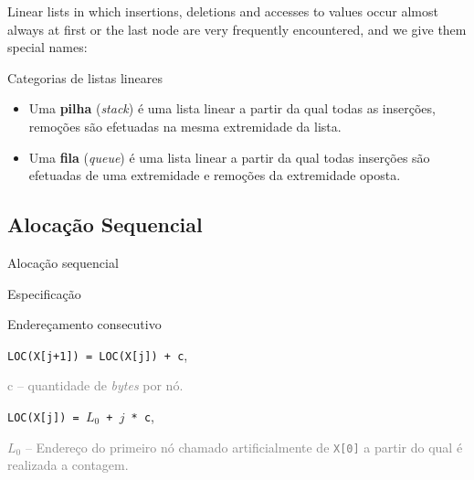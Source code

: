 Linear lists in which insertions, deletions and accesses to values
occur almost always at first or the last node are very frequently
encountered, and we give them special names:

\begin{frame}{Categorias de listas lineares}

\begin{itemize}
\item Uma {\bf pilha} ({\em stack}) é uma lista linear a partir da qual todas as
inserções, remoções são efetuadas na mesma extremidade da lista.
\item Uma {\bf fila} ({\em queue}) é uma lista linear a partir da qual
todas inserções são efetuadas de uma extremidade e remoções da
extremidade oposta.
\end{itemize}

\end{frame}

\subsection{Alocação Sequencial}

\begin{frame}{Alocação sequencial}
\def\width{2}
\def\height{1}
\end{frame}

\begin{frame}[fragile]{Especificação}
\def\tcolor{gray}

\begin{block}{Endereçamento consecutivo}
\begin{minipage}[t]{0.55\textwidth}
{\tt LOC(X[j+1]) = LOC(X[j]) + c},
\end{minipage}
\begin{minipage}[t]{0.4\textwidth}
\textcolor{\tcolor}{
 {\footnotesize c -- quantidade de {\em bytes} por nó}.}
 \end{minipage}
 
\vskip 2cm

\begin{minipage}[t]{0.55\textwidth}
{\tt LOC(X[j]) = $L_0$ + $j$ * c},
\end{minipage}
\begin{minipage}[t]{0.4\textwidth} 
\textcolor{\tcolor}{
{\footnotesize $L_0$ -- Endereço do
primeiro nó chamado artificialmente de {\tt X[0]} a partir do qual é
realizada a contagem}.}
\end{minipage}

\end{block}

\end{frame}

